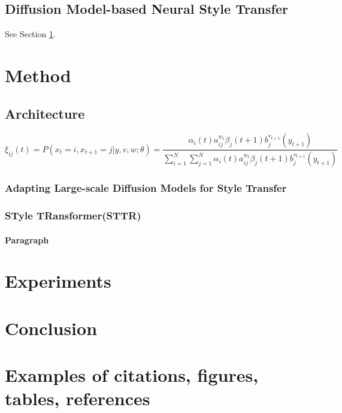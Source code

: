 \documentclass{article}
\begin{document}
\subsection{Diffusion Model-based Neural Style Transfer}
\lipsum[5]

\lipsum[4] See Section \ref{sec:headings}.

\section{Method}
\label{sec:headings}


\subsection{Architecture}
\lipsum[5]
\begin{equation}
	\xi _{ij}(t)=P(x_{t}=i,x_{t+1}=j|y,v,w;\theta)= {\frac {\alpha _{i}(t)a^{w_t}_{ij}\beta _{j}(t+1)b^{v_{t+1}}_{j}(y_{t+1})}{\sum _{i=1}^{N} \sum _{j=1}^{N} \alpha _{i}(t)a^{w_t}_{ij}\beta _{j}(t+1)b^{v_{t+1}}_{j}(y_{t+1})}}
\end{equation}

\subsubsection{Adapting Large-scale Diffusion Models for Style Transfer}
\lipsum[6]

\subsubsection{STyle TRansformer(STTR)}
\lipsum[6]

\paragraph{Paragraph}
\lipsum[7]

\section{Experiments}
\label{sec:experimetns}
\lipsum[7]

\section{Conclusion}
\label{sec:conclusion}
\lipsum[7]

\section{Examples of citations, figures, tables, references}
\label{sec:others}
\end{document}

